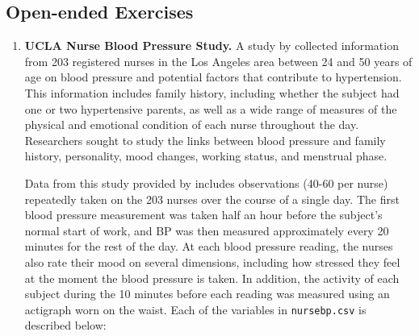\documentclass[
]{krantz}
\begin{document}
\hypertarget{open-ended-exercises-4}{%
\subsection{Open-ended Exercises}\label{open-ended-exercises-4}}

\begin{enumerate}
\def\labelenumi{\arabic{enumi}.}
\item
  \textbf{UCLA Nurse Blood Pressure Study.} A study by \citet{Goldstein2000} collected information from 203 registered nurses in the Los Angeles area between 24 and 50 years of age on blood pressure and potential factors that contribute to hypertension. This information includes family history, including whether the subject had one or two hypertensive parents, as well as a wide range of measures of the physical and emotional condition of each nurse throughout the day. Researchers sought to study the links between blood pressure and family history, personality, mood changes, working status, and menstrual phase.

  Data from this study provided by \citet{Weiss2005} includes observations (40-60 per nurse) repeatedly taken on the 203 nurses over the course of a single day. The first blood pressure measurement was taken half an hour before the subject's normal start of work, and BP was then measured approximately every 20 minutes for the rest of the day. At each blood pressure reading, the nurses also rate their mood on several dimensions, including how stressed they feel at the moment the blood pressure is taken. In addition, the activity of each subject during the 10 minutes before each reading was measured using an actigraph worn on the waist. Each of the variables in \texttt{nursebp.csv} is described below:


\end{enumerate}
\end{document}

